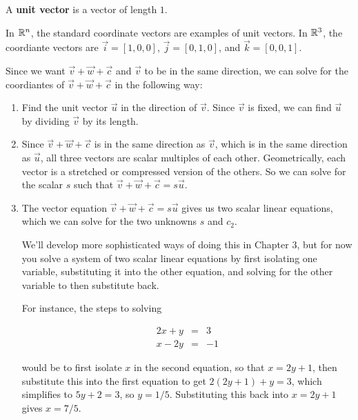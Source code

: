 \documentclass{ximera}
\begin{document}
\begin{example}
\begin{definition}
    A \textbf{unit vector}%
     is a vector of length $1$. 

    In $\mathbb{R}^n$, the standard coordinate vectors are examples of unit vectors. In $\mathbb{R}^3$, the coordiante vectors are $\vec{i}=[1,0,0]$, $\vec{j}=[0,1,0]$, and $\vec{k}=[0,0,1]$.
  \end{definition}

  Since we want $\vec{v}+\vec{w}+\vec{c}$ and $\vec{v}$ to be in the same direction, we can solve for the coordiantes of $\vec{v}+\vec{w}+\vec{c}$ in the following way: 

\begin{enumerate}

\item Find the unit vector $\vec{u}$ in the direction of $\vec{v}$. Since $\vec{v}$ is fixed, we can find $\vec{u}$ by dividing $\vec{v}$ by its length.
\item Since $\vec{v}+\vec{w}+\vec{c}$ is in the same direction as $\vec{v}$, which is in the same direction as $\vec{u}$, all three vectors are scalar multiples of each other. Geometrically, each vector is a stretched or compressed version of the others. So we can solve for the scalar $s$ such that $\vec{v}+\vec{w}+\vec{c}=s\vec{u}$.
\item The vector equation $\vec{v}+\vec{w}+\vec{c}=s\vec{u}$ gives us two scalar linear equations, which we can solve for the two unknowns $s$ and $c_2$.

\begin{hint}

  We'll develop more sophisticated ways of doing this in Chapter 3, but for now you solve a system of two scalar linear equations by first isolating one variable, substituting it into the other equation, and solving for the other variable to then substitute back.

  For instance, the steps to solving 

  $$\begin{array}{rcl}
    2x+y&=&3\\
    x-2y&=&-1
  \end{array}$$

  would be to first isolate $x$ in the second equation, so that $x=2y+1$, then substitute this into the first equation to get $2(2y+1)+y=3$, which simplifies to $5y+2=3$, so $y=1/5$. Substituting this back into $x=2y+1$ gives $x=7/5$.

\end{hint}


\end{enumerate}
\end{example}
\end{document}
